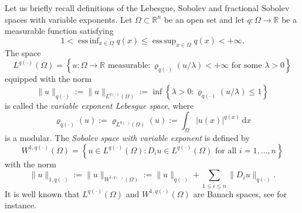 \documentclass[11pt]{amsart}
\theoremstyle{plain}
\theoremstyle{definition}
\numberwithin{equation}{section}
\DeclareMathOperator*{\esssup}{ess\,sup}
\DeclareMathOperator*{\essinf}{ess\,inf}
\begin{document}
Let us briefly recall definitions of the Lebesgue, Sobolev and fractional Sobolev spaces with variable exponents. Let $\Omega \subset \mathbb{R}^{n}$ be an open set and let $q: \Omega \to \mathbb{R}$ be a measurable function satisfying
\begin{equation*}
1 < \essinf_{x \in \Omega} q(x) \leq \esssup_{x \in \Omega} q(x) < +\infty.
\end{equation*}
The space
\begin{equation*}
L^{q(\cdot)}(\Omega) = \left\lbrace u: \Omega \to \mathbb{R} \text{ measurable}: \varrho_{q(\cdot)}(u/\lambda) < +\infty \text{ for some } \lambda > 0 \right\rbrace
\end{equation*}
equipped with the norm 
\begin{equation*}
\|u\|_{q(\cdot)} := \|u\|_{L^{q(\cdot)}(\Omega)} := \inf \left\lbrace \lambda > 0: \varrho_{q(\cdot)}(u/\lambda) \leq 1 \right\rbrace
\end{equation*}
is called the {\it variable exponent Lebesgue space}, where
\begin{equation*}
\varrho_{q(\cdot)}(u) := \varrho_{L^{q(\cdot)}(\Omega)}(u) := \int_{\Omega} |u(x)|^{q(x)}\,\mathrm{d}x
\end{equation*}
is a modular. The {\it Sobolev space with variable exponent} is defined by
\begin{equation*}
W^{1, q(\cdot)}(\Omega) = \left\lbrace u \in L^{q(\cdot)}(\Omega): D_{i}u \in L^{q(\cdot)}(\Omega) \text{ for all } i = 1, \dots, n \right\rbrace
\end{equation*}
with the norm
\begin{equation*}
\|u\|_{1, q(\cdot)} := \|u\|_{W^{1, q(\cdot)}(\Omega)} := \|u\|_{q(\cdot)} + \sum_{1 \leq i \leq n} \|D_{i} u\|_{q(\cdot)}.
\end{equation*}
It is well known that $L^{q(\cdot)}(\Omega)$ and $W^{1, q(\cdot)}(\Omega)$ are Banach spaces, see \cite{CUF13,DHHR11,FZ01,KR91} for instance.
\end{document}
